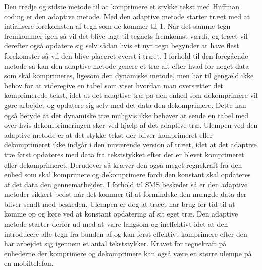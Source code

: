 Den tredje og sidste metode til at komprimere et stykke tekst med Huffman coding er den adaptive metode. Med den adaptive metode starter træet med at intialisere forekomsten af tegn som de kommer til 1. Når det samme tegn fremkommer igen så vil det blive lagt til tegnets fremkomst værdi, og træet vil derefter også opdatere sig selv sådan hvis et nyt tegn begynder at have flest forekomster så vil den blive placeret øverst i træet.
I forhold til den foregående metode så kan den adaptive metode genere et træ alt efter hvad for noget data som skal komprimeres, ligesom den dynamiske metode, men har til gengæld ikke behov for at videregive en tabel som viser hvordan man oversætter det komprimerede tekst, idet at det adaptive træ på den enhed som dekomprimere vil gøre arbejdet og opdatere sig selv med det data den dekomprimere. Dette kan også betyde at det dynamiske træ muligvis ikke behøver at sende en tabel med over hvis dekomprimeringen sker ved hjælp af det adaptive træ. Ulempen ved den adaptive metode er at det stykke tekst der bliver komprimeret eller dekomprimeret ikke indgår i den nuværende version af træet, idet at det adaptive træ først opdateres med data fra tekststykket efter det er blevet komprimeret eller dekomprimeret. Derudover så kræver den også meget regnekraft fra den enhed som skal komprimere og dekomprimere fordi den konstant skal opdateres af det data den gennemarbejder. \cite{Hufftree_5}
I forhold til SMS beskeder så er den adaptive metoder sikkert bedst når det kommer til at formindske den mængde data der bliver sendt med beskeden. Ulempen er dog at træet har brug for tid til at komme op og køre ved at konstant opdatering af sit eget træ. Den adaptive metode starter derfor ud med at være langsom og ineffektivt idet at den introducere alle tegn fra bunden af og kan først effektivt komprimere efter den har arbejdet sig igennem et antal tekststykker. Kravet for regnekraft på enhederne der komprimere og dekomprimere  kan også være en større ulempe på en mobiltelefon.
